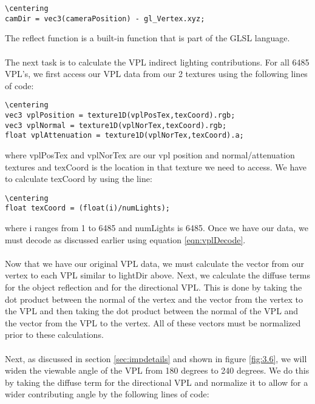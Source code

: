 \begin{lstlisting}
\centering
camDir = vec3(cameraPosition) - gl_Vertex.xyz;
\end{lstlisting}

The reflect function is a built-in function that is part of the GLSL language.  

\paragraph{}
The next task is to calculate the VPL indirect lighting contributions.  For all 6485 VPL's, we first access our VPL data from our 2 textures using the following lines of code:

\begin{lstlisting}
\centering
vec3 vplPosition = texture1D(vplPosTex,texCoord).rgb;
vec3 vplNormal = texture1D(vplNorTex,texCoord).rgb;
float vplAttenuation = texture1D(vplNorTex,texCoord).a;
\end{lstlisting}

where vplPosTex and vplNorTex are our vpl position and normal/attenuation textures and texCoord is the location in that texture we need to access.  We have to calculate texCoord by using the line:

\begin{lstlisting}
\centering
float texCoord = (float(i)/numLights);
\end{lstlisting}

where i ranges from 1 to 6485 and numLights is 6485.  Once we have our data, we must decode as discussed earlier using equation \ref{eqn:vplDecode}.  

\paragraph{}
Now that we have our original VPL data, we must calculate the vector from our vertex to each VPL similar to lightDir above.  Next, we calculate the diffuse terms for the object reflection and for the directional VPL.  This is done by taking the dot product between the normal of the vertex and the vector from the vertex to the VPL and then taking the dot product between the normal of the VPL and the vector from the VPL to the vertex.  All of these vectors must be normalized prior to these calculations.

\paragraph{}
Next, as discussed in section \ref{sec:impdetails} and shown in figure \ref{fig:3.6}, we will widen the viewable angle of the VPL from 180 degrees to 240 degrees.  We do this by taking the diffuse term for the directional VPL and normalize it to allow for a wider contributing angle by the following lines of code:

